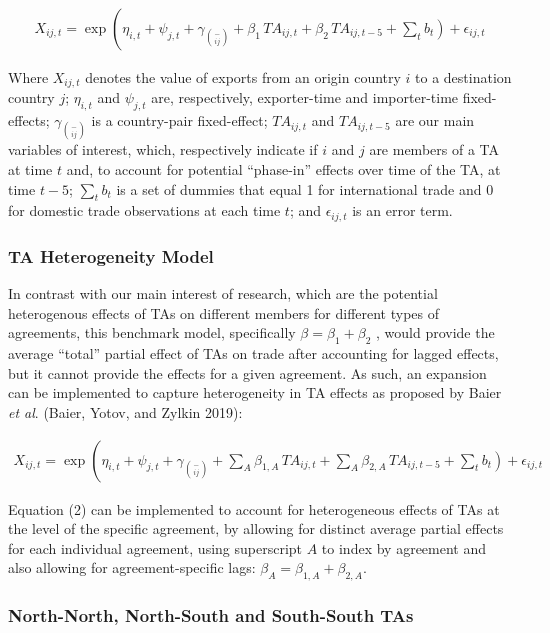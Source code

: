 \documentclass[12pt]{article}%
\begin{document}
\begin{multline}
    X_{ij,t} = \exp\left(\eta_{i,t} + \psi_{j,t} + \gamma_{\binom{-}{ij}} + \beta_{1} \, TA_{ij,t} \right. + \beta_{2} \, TA_{ij,t-5} + \left. \sum_{t} b_{t} \right) + \epsilon_{ij,t}
\end{multline}

Where \(X_{ij,t}\) denotes the value of exports from an origin country
\(i\) to a destination country \(j\); \(\eta_{i,t}\) and \(\psi_{j,t}\)
are, respectively, exporter-time and importer-time fixed-effects;
\(\gamma_{\binom{-}{ij}}\) is a country-pair fixed-effect;
\({TA}_{ij,t}\) and \({TA}_{ij,t - 5}\) are our main variables of
interest, which, respectively indicate if \(i\) and \(j\) are members of
a TA at time \(t\) and, to account for potential ``phase-in'' effects
over time of the TA, at time \(t - 5\); \(\sum_{t}^{}b_{t}\) is a set of
dummies that equal 1 for international trade and 0 for domestic trade
observations at each time \(t\); and \(\epsilon_{ij,t}\) is an error
term.
%
\subsubsection{TA Heterogeneity Model}%
\label{ssubsec:TAHeterogeneityModel}%

%
In contrast with our main interest of research, which are the potential
heterogenous effects of TAs on different members for different types of
agreements, this benchmark model, specifically
\(\beta = \beta_{1} + \beta_{2}\) , would provide the average ``total''
partial effect of TAs on trade after accounting for lagged effects, but
it cannot provide the effects for a given agreement. As such, an
expansion can be implemented to capture heterogeneity in TA effects as
proposed by Baier \emph{et al}. (Baier, Yotov, and Zylkin 2019):

\begin{multline}
    X_{ij,t} = \exp\left(\eta_{i,t} + \psi_{j,t} + \gamma_{\binom{-}{ij}} + \sum_{A} \beta_{1,A} \, TA_{ij,t} \right. + \sum_{A} \beta_{2,A} \, TA_{ij,t-5} + \left. \sum_{t} b_{t} \right) + \epsilon_{ij,t}
\end{multline}

Equation (2) can be implemented to account for heterogeneous effects of
TAs at the level of the specific agreement, by allowing for distinct
average partial effects for each individual agreement, using superscript
\(A\) to index by agreement and also allowing for agreement-specific
lags: \(\beta_{A} = \beta_{1,A} + \beta_{2,A}\).
%
\subsubsection{North{-}North, North{-}South and South{-}South TAs}%
\label{ssubsec:North{-}North,North{-}SouthandSouth{-}SouthTAs}%
\end{document}
